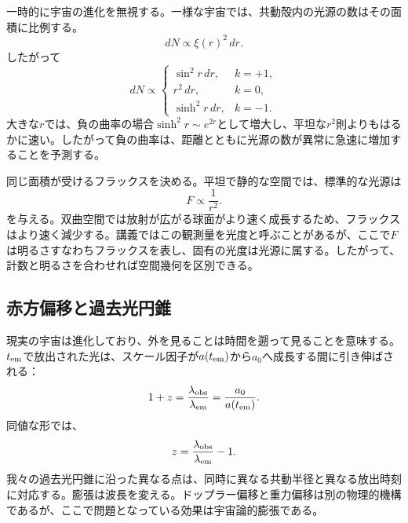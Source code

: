 一時的に宇宙の進化を無視する。一様な宇宙では、共動殻内の光源の数はその面積に比例する。
\begin{equation}
dN\propto \xi(r)^2\,dr.
\label{eq:c06-shell-count}
\end{equation}
したがって
\begin{equation}
dN\propto
\begin{cases}
\sin^2r\,dr, & k=+1,\\
r^2\,dr, & k=0,\\
\sinh^2r\,dr, & k=-1.
\end{cases}
\end{equation}
大きな\(r\)では、負の曲率の場合\(\sinh^2r\sim e^{2r}\)として増大し、平坦な\(r^2\)則よりもはるかに速い。したがって負の曲率は、距離とともに光源の数が異常に急速に増加することを予測する。

同じ面積が受けるフラックスを決める。平坦で静的な空間では、標準的な光源は
\begin{equation}
F\propto\frac{1}{r^2}.
\end{equation}
を与える。双曲空間では放射が広がる球面がより速く成長するため、フラックスはより速く減少する。講義ではこの観測量を光度と呼ぶことがあるが、ここで\(F\)は明るさすなわちフラックスを表し、固有の光度は光源に属する。したがって、計数と明るさを合わせれば空間幾何を区別できる。

\subsection{赤方偏移と過去光円錐}

現実の宇宙は進化しており、外を見ることは時間を遡って見ることを意味する。\(t_{\rm em}\)で放出された光は、スケール因子が\(a(t_{\rm em})\)から\(a_0\)へ成長する間に引き伸ばされる：
\begin{equation}
1+z
=\frac{\lambda_{\rm obs}}{\lambda_{\rm em}}
=\frac{a_0}{a(t_{\rm em})}.
\label{eq:c06-redshift}
\end{equation}
同値な形では、
\begin{equation}
z=\frac{\lambda_{\rm obs}}{\lambda_{\rm em}}-1.
\end{equation}
我々の過去光円錐に沿った異なる点は、同時に異なる共動半径と異なる放出時刻に対応する。膨張は波長を変える。ドップラー偏移と重力偏移は別の物理的機構であるが、ここで問題となっている効果は宇宙論的膨張である。

\begin{classroomqa}
\end{classroomqa}

